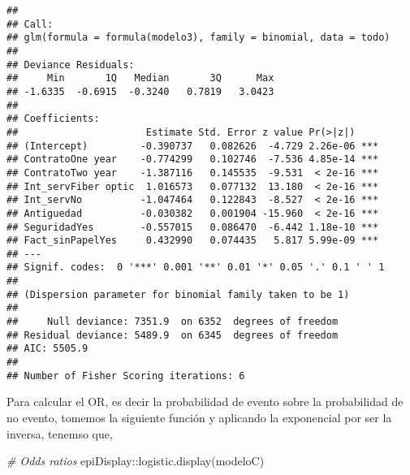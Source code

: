 \documentclass[
]{article}
\newenvironment{Shaded}{\begin{snugshade}}{\end{snugshade}}
\newcommand{\CommentTok}[1]{\textcolor[rgb]{0.56,0.35,0.01}{\textit{#1}}}
\newcommand{\FunctionTok}[1]{\textcolor[rgb]{0.00,0.00,0.00}{#1}}
\newcommand{\NormalTok}[1]{#1}
\newcommand{\SpecialCharTok}[1]{\textcolor[rgb]{0.00,0.00,0.00}{#1}}
\begin{document}
\begin{verbatim}
## 
## Call:
## glm(formula = formula(modelo3), family = binomial, data = todo)
## 
## Deviance Residuals: 
##     Min       1Q   Median       3Q      Max  
## -1.6335  -0.6915  -0.3240   0.7819   3.0423  
## 
## Coefficients:
##                      Estimate Std. Error z value Pr(>|z|)    
## (Intercept)         -0.390737   0.082626  -4.729 2.26e-06 ***
## ContratoOne year    -0.774299   0.102746  -7.536 4.85e-14 ***
## ContratoTwo year    -1.387116   0.145535  -9.531  < 2e-16 ***
## Int_servFiber optic  1.016573   0.077132  13.180  < 2e-16 ***
## Int_servNo          -1.047464   0.122843  -8.527  < 2e-16 ***
## Antiguedad          -0.030382   0.001904 -15.960  < 2e-16 ***
## SeguridadYes        -0.557015   0.086470  -6.442 1.18e-10 ***
## Fact_sinPapelYes     0.432990   0.074435   5.817 5.99e-09 ***
## ---
## Signif. codes:  0 '***' 0.001 '**' 0.01 '*' 0.05 '.' 0.1 ' ' 1
## 
## (Dispersion parameter for binomial family taken to be 1)
## 
##     Null deviance: 7351.9  on 6352  degrees of freedom
## Residual deviance: 5489.9  on 6345  degrees of freedom
## AIC: 5505.9
## 
## Number of Fisher Scoring iterations: 6
\end{verbatim}

Para calcular el OR, es decir la probabilidad de evento sobre la
probabilidad de no evento, tomemos la siguiente función y aplicando la
exponencial por ser la inversa, tenemso que,

\begin{Shaded}
\begin{Highlighting}[]
\CommentTok{\# Odds ratios}
\NormalTok{epiDisplay}\SpecialCharTok{::}\FunctionTok{logistic.display}\NormalTok{(modeloC)}
\end{Highlighting}
\end{Shaded}
\end{document}
